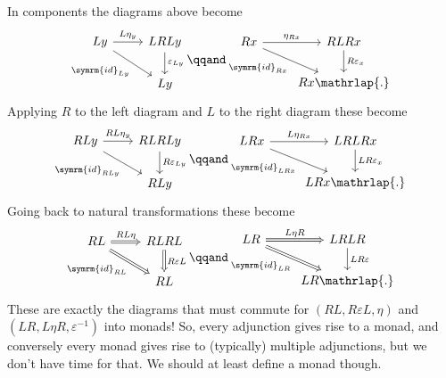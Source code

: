 \documentclass[fleqn]{NotesClass}
\newcommand{\id}{\symrm{id}}
\begin{document}
    In components the diagrams above become
    \begin{equation}
        \begin{tikzcd}
            Ly \arrow[r, "L \eta_y"] \arrow[dr, "\id_{Ly}"'] & LRLy \arrow[d, "\varepsilon_{Ly}"]\\
            & Ly
        \end{tikzcd}
        \qqand
        \begin{tikzcd}
            Rx \arrow[r, "\eta_{Rx}"] \arrow[dr, "\id_{Rx}"']& RLRx \arrow[d, "R\varepsilon_x"]\\
            & Rx \mathrlap{.}
        \end{tikzcd}
    \end{equation}
    Applying \(R\) to the left diagram and \(L\) to the right diagram these become
    \begin{equation}
        \begin{tikzcd}
            RLy \arrow[r, "RL \eta_y"] \arrow[dr, "\id_{RLy}"'] & RLRLy \arrow[d, "R\varepsilon_{Ly}"]\\
            & RLy
        \end{tikzcd}
        \qqand
        \begin{tikzcd}
            LRx \arrow[r, "L\eta_{Rx}"] \arrow[dr, "\id_{LRx}"']& LRLRx \arrow[d, "LR\varepsilon_x"]\\
            & LRx \mathrlap{.}
        \end{tikzcd}
    \end{equation}
    Going back to natural transformations these become
    \begin{equation}
        \begin{tikzcd}
            RL \arrow[r, Rightarrow, "RL \eta"] \arrow[dr, Rightarrow, "\id_{RL}"'] & RLRL \arrow[d, Rightarrow, "R\varepsilon L"]\\
            & RL
        \end{tikzcd}
        \qqand
        \begin{tikzcd}
            LR \arrow[r, Rightarrow, "L\eta R"] \arrow[dr, Rightarrow, "\id_{LR}"']& LRLR \arrow[d, "LR\varepsilon"]\\
            & LR \mathrlap{.}
        \end{tikzcd}
    \end{equation}
    These are exactly the diagrams that must commute for \((RL, R\varepsilon L, \eta)\) and \((LR, L\eta R, \varepsilon^{-1})\) into monads!
    So, every adjunction gives rise to a monad, and conversely every monad gives rise to (typically) multiple adjunctions, but we don't have time for that.
    We should at least define a monad though.
    
\end{document}

